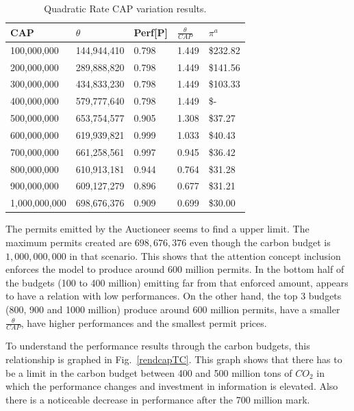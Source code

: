 \documentclass[a4paper,fleqn]{cas-dc}
\begin{document}
\begin{table}[H]
    \centering
    \caption{{\footnotesize Quadratic Rate CAP variation results.}}
    \label{resultadostasacuadrada}
    \begin{tabular}{ l l l l l}
    \hline
        CAP & $\theta$ & Perf[P] & $\frac{\theta}{CAP}$  & $\pi^a$  \\ \hline
        100,000,000 & 144,944,410  & 0.798  & 1.449  &  \$232.82   \\ \hline
        200,000,000 & 289,888,820  & 0.798  & 1.449  &  \$141.56   \\ \hline
        300,000,000 & 434,833,230  & 0.798  & 1.449  &  \$103.33   \\ \hline
        400,000,000 & 579,777,640  & 0.798  & 1.449  &  \$-   \\ \hline
        500,000,000 & 653,754,577  & 0.905  & 1.308  &  \$37.27   \\ \hline
        600,000,000 & 619,939,821  & 0.999  & 1.033  &  \$40.43   \\ \hline
        700,000,000 & 661,258,561  & 0.997  & 0.945  &  \$36.42   \\ \hline
        800,000,000 & 610,913,181  & 0.944  & 0.764  &  \$31.28   \\ \hline
        900,000,000 & 609,127,279  & 0.896  & 0.677  &  \$31.21   \\ \hline
        1,000,000,000 & 698,676,376  & 0.909  & 0.699  &  \$30.00   \\ \hline
    \end{tabular}
\end{table}

The permits emitted by the Auctioneer seems to find a upper limit. The maximum permits created are $698,676,376$ even though the carbon budget is $1,000,000,000$ in that scenario. This shows that the attention concept inclusion enforces the model to produce around 600 million permits. In the bottom half of the budgets (100 to 400 million) emitting far from that enforced amount, appears to have a relation with low performances. On the other hand, the top 3 budgets (800, 900 and 1000 million) produce around 600 million permits, have a smaller $\frac{\theta}{CAP}$, have higher performances and the smallest permit prices. 

To understand the performance results through the carbon budgets, this relationship is graphed in Fig.~\ref{rendcapTC}. This graph shows that there has to be a limit in the carbon budget between 400 and 500 million tons of $CO_2$ in which the performance changes and investment in information is elevated. Also there is a noticeable decrease in performance after the 700 million mark.
\end{document}
